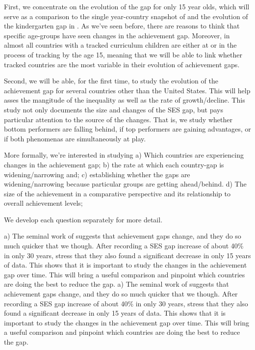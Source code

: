 \documentclass[11pt, a4paper]{article}\usepackage[]{graphicx}\usepackage[]{color}
\begin{document}
First, we concentrate on the evolution of the gap for only 15 year olds, which will serve as a comparison to the single year-country snapshot of \citet{anna2016} and the evolution of the kindergarten gap in \citet{reardon_portilla}. As we've seen before, there are reasons to think that specific age-groups have seen changes in the achievement gap. Moreover, in almost all countries with a tracked curriculum children are either at or in the process of tracking by the age 15, meaning that we will be able to link whether tracked countries are the most variable in their evolution of achievement gaps.

Second, we will be able, for the first time, to study the evolution of the achievement gap for several countries other than the United States. This will help asses the mangitude of the inequality as well as the rate of growth/decline. This study not only documents the size and changes of the SES gap, but pays particular attention to the source of the changes. That is, we study whether bottom performers are falling behind, if top performers are gaining advantages, or if both phenomenas are simultaneously at play.

More formally, we're interested in studying
a) Which countries are experiencing changes in the achievement gap;
b) the rate at which each country-gap is widening/narrowing and;
c) establishing whether the gaps are widening/narrowing because particular groups are getting ahead/behind.
d) The size of the achievement in a comparative perspective and its relationship to overall achievement levels;

We develop each question separately for more detail.

a) The seminal work of \citet{reardon2011} suggests that achievement gaps change, and they do so much quicker that we though. After recording a SES gap increase of about 40\% in only 30 years, \citep{reardon_portilla} stress that they also found a significant decrease in only 15 years of data. This shows that it is important to study the changes in the achievement gap over time. This will bring a useful comparison and pinpoint which countries are doing the best to reduce the gap.
a) The seminal work of \citet{reardon2011} suggests that achievement gaps change, and they do so much quicker that we though. After recording a SES gap increase of about 40\% in only 30 years, \citet{reardon_portilla} stress that they also found a significant decrease in only 15 years of data. This shows that it is important to study the changes in the achievement gap over time. This will bring a useful comparison and pinpoint which countries are doing the best to reduce the gap.
\end{document}
